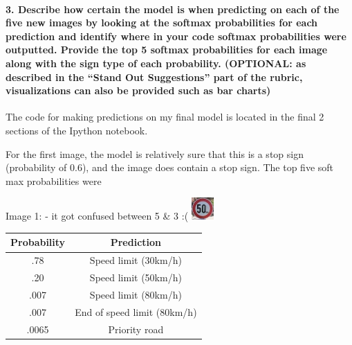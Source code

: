 \documentclass[11pt]{article}
\makeatletter
\def\maxwidth{\ifdim\Gin@nat@width>\linewidth\linewidth
    \else\Gin@nat@width\fi}
\let\Oldincludegraphics\includegraphics
\renewcommand{\includegraphics}[1]{\Oldincludegraphics[width=.8\maxwidth]{#1}}
\makeatother
\begin{document}
\paragraph{\texorpdfstring{3. Describe how certain the model is when
predicting on each of the five new images by looking at the softmax
probabilities for each prediction and identify where in your code
softmax probabilities were outputted. Provide the top 5 softmax
probabilities for each image along with the sign type of each
probability. (OPTIONAL: as described in the ``Stand Out Suggestions''
part of the rubric, visualizations can also be provided such as bar
charts)}{3. Describe how certain the model is when predicting on each of the five new images by looking at the softmax probabilities for each prediction and identify where in your code softmax probabilities were outputted. Provide the top 5 softmax probabilities for each image along with the sign type of each probability. (OPTIONAL: as described in the Stand Out Suggestions part of the rubric, visualizations can also be provided such as bar charts)}}\label{describe-how-certain-the-model-is-when-predicting-on-each-of-the-five-new-images-by-looking-at-the-softmax-probabilities-for-each-prediction-and-identify-where-in-your-code-softmax-probabilities-were-outputted.-provide-the-top-5-softmax-probabilities-for-each-image-along-with-the-sign-type-of-each-probability.-optional-as-described-in-the-stand-out-suggestions-part-of-the-rubric-visualizations-can-also-be-provided-such-as-bar-charts}

The code for making predictions on my final model is located in the
final 2 sections of the Ipython notebook.

For the first image, the model is relatively sure that this is a stop
sign (probability of 0.6), and the image does contain a stop sign. The
top five soft max probabilities were

Image 1: - it got confused between 5 \& 3 :(
\includegraphics{./private/2-1.jpg}

\begin{longtable}[]{@{}cc@{}}
\toprule
Probability & Prediction\tabularnewline
\midrule
\endhead
.78 & Speed limit (30km/h)\tabularnewline
.20 & Speed limit (50km/h)\tabularnewline
.007 & Speed limit (80km/h)\tabularnewline
.007 & End of speed limit (80km/h)\tabularnewline
.0065 & Priority road\tabularnewline
\bottomrule
\end{longtable}
\end{document}
